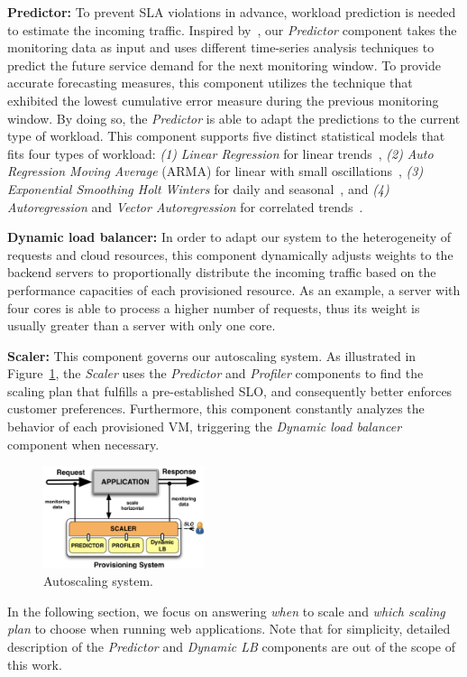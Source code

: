 \textbf{Predictor:} To prevent SLA violations in advance, workload prediction is needed to estimate the incoming traffic. Inspired by~\cite{wolski_network_1999}, our \emph{Predictor} component takes the monitoring data as input and uses different time-series analysis techniques to predict the future service demand for the next monitoring window. To provide accurate forecasting measures, this component utilizes the technique that exhibited the lowest cumulative error measure during the previous monitoring window. By doing so, the \emph{Predictor} is able to adapt the predictions to the current type of workload. This component supports five distinct statistical models that fits four types of workload: \emph{(1)} \emph{Linear Regression} for linear trends~\cite{muppala_regression-based_2012}, \emph{(2)} \emph{Auto Regression Moving Average} (ARMA) for linear with small oscillations~\cite{roy_efficient_2011}, \emph{(3)} \emph{Exponential Smoothing Holt Winters} for daily and seasonal~\cite{exponential_smoothing2010}, and \emph{(4)} \emph{Autoregression} and \emph{Vector Autoregression} for correlated trends~\cite{chandra_dynamic_2003}. 




\textbf{Dynamic load balancer:} In order to adapt our system to the heterogeneity of requests and cloud resources, this component dynamically adjusts weights to the backend servers to proportionally distribute the incoming traffic based on the performance capacities of each provisioned resource. As an example, a server with four cores is able to process a higher number of requests, thus its weight is usually greater than a server with only one core.


\textbf{Scaler:} This component governs our autoscaling system. As illustrated in Figure~\ref{autoScalingSys}, the \emph{Scaler} uses the \emph{Predictor} and \emph{Profiler} components to find the scaling plan that fulfills a pre-established SLO, and consequently better enforces customer preferences. Furthermore, this component constantly analyzes the behavior of each provisioned VM, triggering the \emph{Dynamic load balancer} component when necessary.

\begin{figure}[t]
  \begin{center}
    \includegraphics[width=.7\linewidth, height=3cm]{images/monitoringSchema}
  \end{center}
\vspace{-4mm}
  \caption{Autoscaling system.}
  \label{autoScalingSys}
\end{figure}

In the following section, we focus on answering \emph{when} to scale and \emph{which scaling plan} to choose when running web applications. Note that for simplicity, detailed description of the \emph{Predictor} and \emph{Dynamic LB} components are out of the scope of this work.